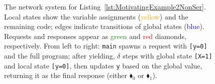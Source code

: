 \begin{figure}[!htbp]
\begin{tikzpicture}[
		node distance=1.5cm and 2.5cm,
		>=stealth,
		thick,
		every node/.style={font=\small}
	]
	\end{tikzpicture}
	\caption{The network system for Listing~\ref{lst:MotivatingExample2NonSer}. 
		Local states show the variable assignments (\textcolor{orange}{yellow}) and the remaining code; edges indicate transitions of global states  (\textcolor{blue}{blue}). 
		Requests and responses appear as \textcolor{ForestGreen}{green} and \textcolor{red}{red} diamonds, respectively. 
		From left to right:  \texttt{main} spawns a request with \texttt{[y=0]} and the full program; after yielding, $\delta$ steps with global state \texttt{[X=1]} and local state \texttt{[y=0]}, then updates \texttt{y} based on the global value, returning it as the final response (either {\color{red}$\blacklozenge_0$} or {\color{red}$\blacklozenge_1$}).}

\label{fig:code2ExampleNS}
\end{figure}


